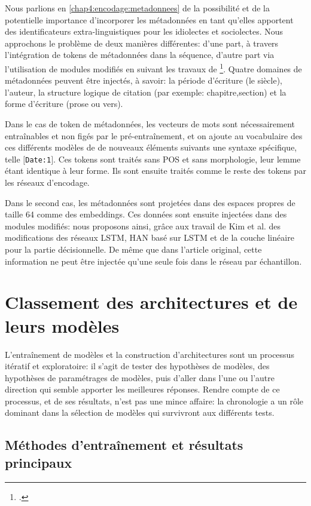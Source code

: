 Nous parlions en \ref{chap4:encodage:metadonnees} de la possibilité et de la potentielle importance d'incorporer les métadonnées en tant qu'elles apportent des identificateurs extra-linguistiques pour les idiolectes et sociolectes. Nous approchons le problème de deux manières différentes: d'une part, à travers l'intégration de tokens de métadonnées dans la séquence, d'autre part via l'utilisation de modules modifiés en suivant les travaux de \footcite{kim_categorical_2019}. Quatre domaines de métadonnées peuvent être injectés, à savoir: la période d'écriture (le siècle), l'auteur, la structure logique de citation (par exemple: chapitre,section) et la forme d'écriture (prose ou vers).

Dans le cas de token de métadonnées, les vecteurs de mots sont nécessairement entraînables et non figés par le pré-entraînement, et on ajoute au vocabulaire des ces différents modèles de de nouveaux éléments suivants une syntaxe spécifique, telle \texttt{$[$Date:1$]$}. Ces tokens sont traités sans POS et sans morphologie, leur lemme étant identique à leur forme. Ils sont ensuite traités comme le reste des tokens par les réseaux d'encodage.

Dans le second cas, les métadonnées sont projetées dans des espaces propres de taille 64 comme des embeddings. Ces données sont ensuite injectées dans des modules modifiés: nous proposons ainsi, grâce aux travail de Kim et al. des modifications des réseaux LSTM, HAN basé sur LSTM et de la couche linéaire pour la partie décisionnelle. De même que dans l'article original, cette information ne peut être injectée qu'une seule fois dans le réseau par échantillon.

\section{Classement des architectures et de leurs modèles}
\label{chap4:part3}

L'entraînement de modèles et la construction d'architectures sont un processus itératif et exploratoire: il s'agit de tester des hypothèses de modèles, des hypothèses de paramétrages de modèles, puis d'aller dans l'une ou l'autre direction qui semble apporter les meilleures réponses. Rendre compte de ce processus, et de ses résultats, n'est pas une mince affaire: la chronologie a un rôle dominant dans la sélection de modèles qui survivront aux différents tests.

\subsection{Méthodes d'entraînement et résultats principaux}

